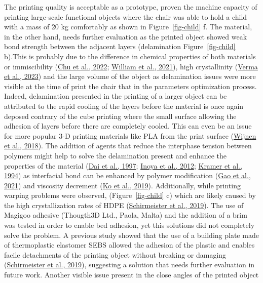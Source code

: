 \documentclass[
  12pt,
]{article}
\begin{document}
The printing quality is acceptable as a prototype, proven the machine
capacity of printing large-scale functional objects where the chair was
able to hold a child with a mass of 20 kg comfortably as shown in
Figure~\ref{fig-child} f. The material, in the other hand, needs further
evaluation as the printed object showed weak bond strength between the
adjacent layers (delamination Figure~\ref{fig-child} b).This is probably
due to the difference in chemical properties of both materials or
immiscibility (\protect\hyperlink{ref-chu2022}{Chu et al., 2022};
\protect\hyperlink{ref-william2021}{William et al., 2021}), high
crystallinity (\protect\hyperlink{ref-verma2023}{Verma et al., 2023})
and the large volume of the object as delamination issues were more
visible at the time of print the chair that in the parameters
optimization process. Indeed, delamination presented in the printing of
a larger object can be attributed to the rapid cooling of the layers
before the material is once again deposed contrary of the cube printing
where the small surface allowing the adhesion of layers before there are
completely cooled. This can even be an issue for more popular 3-D
printing materials like PLA from the print surface
(\protect\hyperlink{ref-wijnen2018}{Wijnen et al., 2018}). The addition
of agents that reduce the interphase tension between polymers might help
to solve the delamination present and enhance the properties of the
material (\protect\hyperlink{ref-dai1997}{Dai et al., 1997};
\protect\hyperlink{ref-inoya2012}{Inoya et al., 2012};
\protect\hyperlink{ref-kramer1994}{Kramer et al., 1994}) as interfacial
bond can be enhanced by polymer modification
(\protect\hyperlink{ref-gao2021}{Gao et al., 2021}) and viscosity
decrement (\protect\hyperlink{ref-ko2019}{Ko et al., 2019}).
Additionally, while printing warping problems were observed,
(Figure~\ref{fig-child} c) which are likely caused by the high
crystallization rates of HDPE
(\protect\hyperlink{ref-schirmeister2019}{Schirmeister et al., 2019}).
The use of Magigoo adhesive (Thougth3D Ltd., Paola, Malta) and the
addition of a brim was tested in order to enable bed adhesion, yet this
solutions did not completely solve the problem. A previous study showed
that the use of a building plate made of thermoplastic elastomer SEBS
allowed the adhesion of the plastic and enables facile detachments of
the printing object without breaking or damaging
(\protect\hyperlink{ref-schirmeister2019}{Schirmeister et al., 2019}),
suggesting a solution that needs further evaluation in future work.
Another visible issue present in the close angles of the printed object
\end{document}
